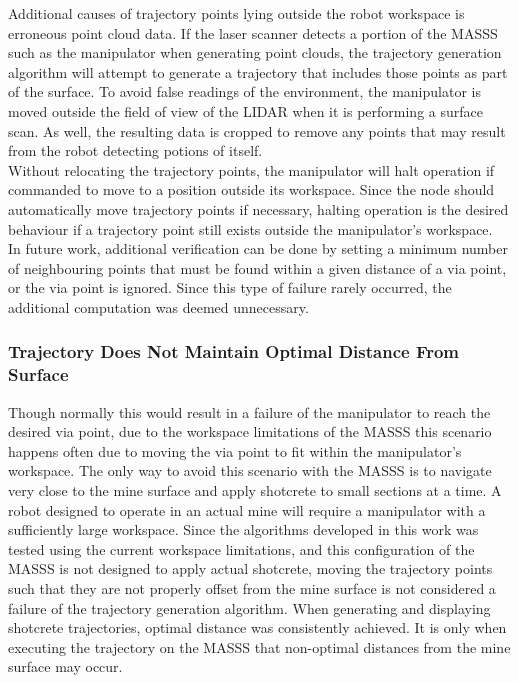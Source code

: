 Additional causes of trajectory points lying outside the robot workspace is erroneous point cloud data. If the laser scanner detects a portion of the MASSS such as the manipulator when generating point clouds, the trajectory generation algorithm will attempt to generate a trajectory that includes those points as part of the surface. To avoid false readings of the environment, the manipulator is moved outside the field of view of the LIDAR when it is performing a surface scan. As well, the resulting data is cropped to remove any points that may result from the robot detecting potions of itself.\\

Without relocating the trajectory points, the manipulator will halt operation if commanded to move to a position outside its workspace. Since the  node should automatically move trajectory points if necessary, halting operation is the desired behaviour if a trajectory point still exists outside the manipulator's workspace.\\

In future work, additional verification can be done by setting a minimum number of neighbouring points that must be found within a given distance of a via point, or the via point is ignored. Since this type of failure rarely occurred, the additional computation was deemed unnecessary.\\

\subsubsection{Trajectory Does Not Maintain Optimal Distance From Surface}

Though normally this would result in a failure of the manipulator to reach the desired via point, due to the workspace limitations of the MASSS this scenario happens often due to moving the via point to fit within the manipulator's workspace. The only way to avoid this scenario with the MASSS is to navigate very close to the mine surface and apply shotcrete to small sections at a time. A robot designed to operate in an actual mine will require a manipulator with a sufficiently large workspace. Since the algorithms developed in this work was tested using the current workspace limitations, and this configuration of the MASSS is not designed to apply actual shotcrete, moving the trajectory points such that they are not properly offset from the mine surface is not considered a failure of the trajectory generation algorithm. When generating and displaying shotcrete trajectories, optimal distance was consistently achieved. It is only when executing the trajectory on the MASSS that non-optimal distances from the mine surface may occur.\\

